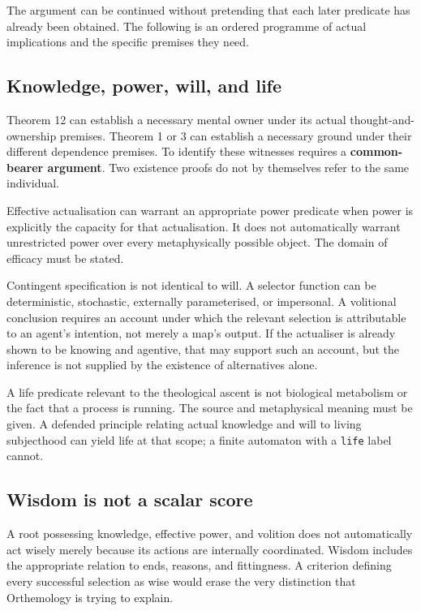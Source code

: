 \documentclass[11pt,a4paper]{article}
\begin{document}
The argument can be continued without pretending that each later
predicate has already been obtained. The following is an ordered
programme of actual implications and the specific premises they need.

\subsection{Knowledge, power, will, and
life}\label{knowledge-power-will-and-life}


Theorem 12 can establish a necessary mental owner under its actual
thought-and-ownership premises. Theorem 1 or 3 can establish a necessary
ground under their different dependence premises. To identify these
witnesses requires a \textbf{common-bearer argument}. Two existence
proofs do not by themselves refer to the same individual.

Effective actualisation can warrant an appropriate power predicate when
power is explicitly the capacity for that actualisation. It does not
automatically warrant unrestricted power over every metaphysically
possible object. The domain of efficacy must be stated.

Contingent specification is not identical to will. A selector function
can be deterministic, stochastic, externally parameterised, or
impersonal. A volitional conclusion requires an account under which the
relevant selection is attributable to an agent's intention, not merely a
map's output. If the actualiser is already shown to be knowing and
agentive, that may support such an account, but the inference is not
supplied by the existence of alternatives alone.

A life predicate relevant to the theological ascent is not biological
metabolism or the fact that a process is running. The source and
metaphysical meaning must be given. A defended principle relating actual
knowledge and will to living subjecthood can yield life at that scope; a
finite automaton with a \texttt{life} label cannot.

\subsection{Wisdom is not a scalar
score}\label{wisdom-is-not-a-scalar-score}

A root possessing knowledge, effective power, and volition does not
automatically act wisely merely because its actions are internally
coordinated. Wisdom includes the appropriate relation to ends, reasons,
and fittingness. A criterion defining every successful selection as wise
would erase the very distinction that Orthemology is trying to explain.
\end{document}
